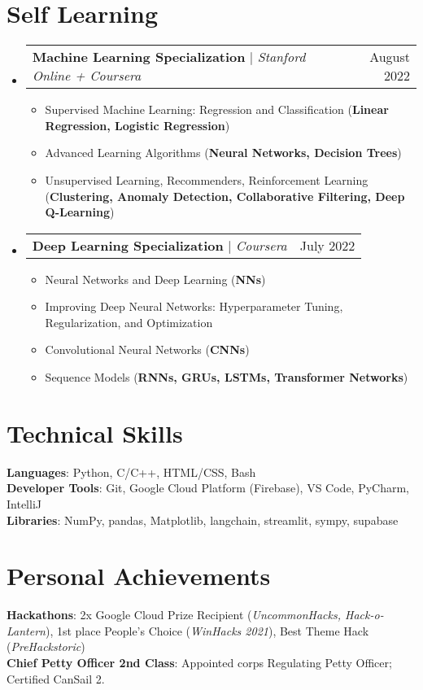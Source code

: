 \documentclass[letterpaper,11pt]{article}
\makeatletter
\newcommand{\resumeItem}[1]{
  \item\small{
    {#1 \vspace{-2pt}}
  }
}
\newcommand{\resumeProjectHeading}[2]{
    \item
    \begin{tabular*}{0.97\textwidth}{l@{\extracolsep{\fill}}r}
      \small#1 & #2 \\
    \end{tabular*}\vspace{-7pt}
}
\newcommand{\resumeSubHeadingListStart}{\begin{itemize}[leftmargin=0.15in, label={}]}
\newcommand{\resumeSubHeadingListEnd}{\end{itemize}}
\newcommand{\resumeItemListStart}{\begin{itemize}}
\newcommand{\resumeItemListEnd}{\end{itemize}\vspace{-5pt}}
\makeatother
\begin{document}
\section{Self Learning}
    \resumeSubHeadingListStart
      \resumeProjectHeading
          {\textbf{Machine Learning Specialization} $|$ \emph{Stanford Online + Coursera}}{August 2022}
          \resumeItemListStart
                \resumeItem {Supervised Machine Learning: Regression and Classification (\textbf{Linear Regression, Logistic Regression})}
                \resumeItem {Advanced Learning Algorithms (\textbf{Neural Networks, Decision Trees})}
                \resumeItem {Unsupervised Learning, Recommenders, Reinforcement Learning (\textbf{Clustering, Anomaly Detection, Collaborative Filtering, Deep Q-Learning})}
          \resumeItemListEnd
      \resumeProjectHeading
          {\textbf{Deep Learning Specialization} $|$ \emph{Coursera}}{July 2022}
          \resumeItemListStart
                \resumeItem {Neural Networks and Deep Learning (\textbf{NNs})}
                \resumeItem {Improving Deep Neural Networks: Hyperparameter Tuning, Regularization, and Optimization}
                \resumeItem {Convolutional Neural Networks (\textbf{CNNs})}
                \resumeItem {Sequence Models (\textbf{RNNs, GRUs, LSTMs, Transformer Networks})}
          \resumeItemListEnd
    \resumeSubHeadingListEnd


\section{Technical Skills}
 \begin{itemize}[leftmargin=0.15in, label={}]
    \small{\item{
     \textbf{Languages}{: Python, C/C++, HTML/CSS, Bash} \\
     \textbf{Developer Tools}{: Git, Google Cloud Platform (Firebase), VS Code, PyCharm, IntelliJ} \\
     \textbf{Libraries}{:  NumPy, pandas, Matplotlib, langchain, streamlit, sympy, supabase}
    }}
 \end{itemize}

\section{Personal Achievements}
 \begin{itemize}[leftmargin=0.15in, label={}]
    \small{\item{
      \textbf{Hackathons}{: 2x Google Cloud Prize Recipient (\emph{UncommonHacks, Hack-o-Lantern}), 1st place People's Choice (\emph{WinHacks 2021}), Best Theme Hack (\emph{PreHackstoric}) } \\
        }
     \textbf{Chief Petty Officer 2nd Class}{: Appointed corps Regulating Petty Officer; Certified CanSail 2.}}
 \end{itemize}


\end{document}
